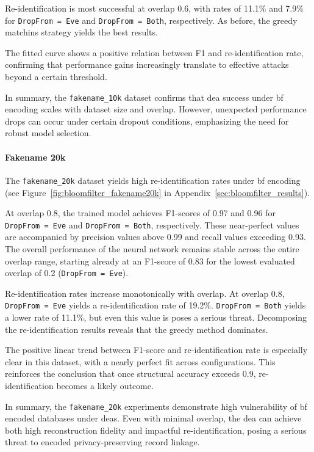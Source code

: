 Re-identification is most successful at overlap 0.6, with rates of 11.1\% and 7.9\% for \texttt{DropFrom = Eve} and \texttt{DropFrom = Both}, respectively.
As before, the greedy matchins strategy yields the best results.

The fitted curve shows a positive relation between F1 and re-identification rate, confirming that performance gains increasingly translate to effective attacks beyond a certain threshold.

In summary, the \texttt{fakename\_10k} dataset confirms that \ac{dea} success under \ac{bf} encoding scales with dataset size and overlap.
However, unexpected performance drops can occur under certain dropout conditions, emphasizing the need for robust model selection.

\paragraph{Fakename 20k}

The \texttt{fakename\_20k} dataset yields high re-identification rates under \ac{bf} encoding (see Figure~\ref{fig:bloomfilter_fakename20k} in Appendix~\ref{sec:bloomfilter_results}).

At overlap 0.8, the trained model achieves F1-scores of 0.97 and 0.96 for \texttt{DropFrom = Eve} and \texttt{DropFrom = Both}, respectively.
These near-perfect values are accompanied by precision values above 0.99 and recall values exceeding 0.93.
The overall performance of the neural network remains stable across the entire overlap range, starting already at an F1-score of 0.83 for the lowest evaluated overlap of 0.2 (\texttt{DropFrom = Eve}).

Re-identification rates increase monotonically with overlap.
At overlap 0.8, \texttt{DropFrom = Eve} yields a re-identification rate of 19.2\%.
\texttt{DropFrom = Both} yields a lower rate of 11.1\%, but even this value is poses a serious threat.
Decomposing the re-identification results reveals that the greedy method dominates.

The positive linear trend between F1-score and re-identification rate is especially clear in this dataset, with a nearly perfect fit across configurations.
This reinforces the conclusion that once structural accuracy exceeds 0.9, re-identification becomes a likely outcome.

In summary, the \texttt{fakename\_20k} experiments demonstrate high vulnerability of \ac{bf} encoded databases under \ac{dea}s.
Even with minimal overlap, the \ac{dea} can achieve both high reconstruction fidelity and impactful re-identification, posing a serious threat to encoded privacy-preserving record linkage.

